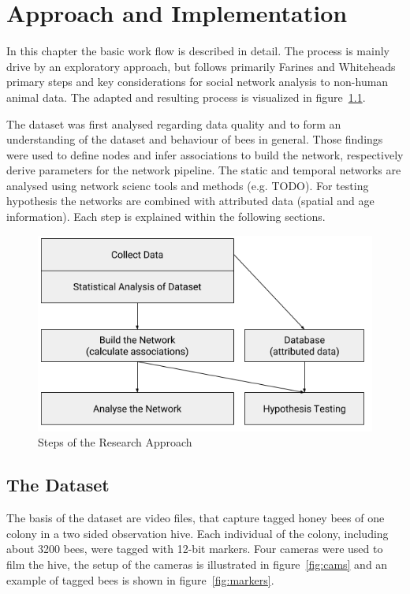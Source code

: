 \chapter{Approach and Implementation}
\label{ch:approach}
In this chapter the basic work flow is described in detail. The process is mainly drive by an exploratory approach, but follows primarily Farines and Whiteheads~\cite{farine2015constructing} primary steps and key considerations for social network analysis to non-human animal data. The adapted and resulting process is visualized in figure~\ref{fig:process}.

The dataset was first analysed regarding data quality and to form an understanding of the dataset and behaviour of bees in general. Those findings were used to define nodes and infer associations to build the network, respectively derive parameters for the network pipeline. The static and temporal networks are analysed using network scienc tools and methods (e.g. TODO). For testing hypothesis the networks are combined with attributed data (spatial and age information). Each step is explained within the following sections.

\begin{figure}[htb]
	\centering
	\includegraphics[width=1.0\textwidth]{Figures/WorkProcess}
	\caption{Steps of the Research Approach}
	\label{fig:process}
\end{figure}


\section{The Dataset}
\label{sec:dataset}
The basis of the dataset are video files, that capture tagged honey bees of one colony in a two sided observation hive.
Each individual of the colony, including about 3200 bees, were tagged with 12-bit markers. Four cameras were used to film the hive, the setup of the cameras is illustrated in figure~\ref{fig:cams} and an example of tagged bees is shown in figure~\ref{fig:markers}.

